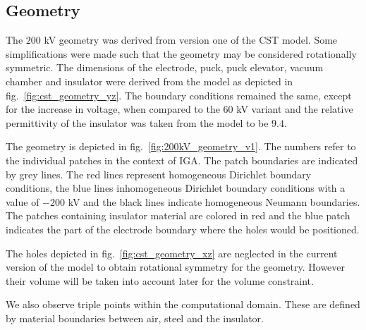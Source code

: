 \subsection{Geometry}
The $200$ kV geometry was derived from version one of the CST model. Some simplifications were made such that the geometry may be considered rotationally symmetric. The dimensions of the electrode, puck, puck elevator, vacuum chamber and insulator were derived from the model as depicted in fig.~\ref{fig:cst_geometry_yz}. The boundary conditions remained the same, except for the increase in voltage, when compared to the $60$ kV variant and the relative permittivity of the insulator was taken from the model to be $9.4$.

The geometry is depicted in fig.~\ref{fig:200kV_geometry_v1}. The numbers refer to the individual patches in the context of IGA. The patch boundaries are indicated by grey lines. The red lines represent homogeneous Dirichlet boundary conditions, the blue lines inhomogeneous Dirichlet boundary conditions with a value of $-200$ kV and the black lines indicate homogeneous Neumann boundaries.
The patches containing insulator material are colored in red and the blue patch indicates the part of the electrode boundary where the holes would be positioned.

The holes depicted in fig.~\ref{fig:cst_geometry_xz} are neglected in the current version of the model to obtain rotational symmetry for the geometry. However their volume will be taken into account later for the volume constraint.

We also observe triple points within the computational domain. These are defined by material boundaries between air, steel and the insulator.

